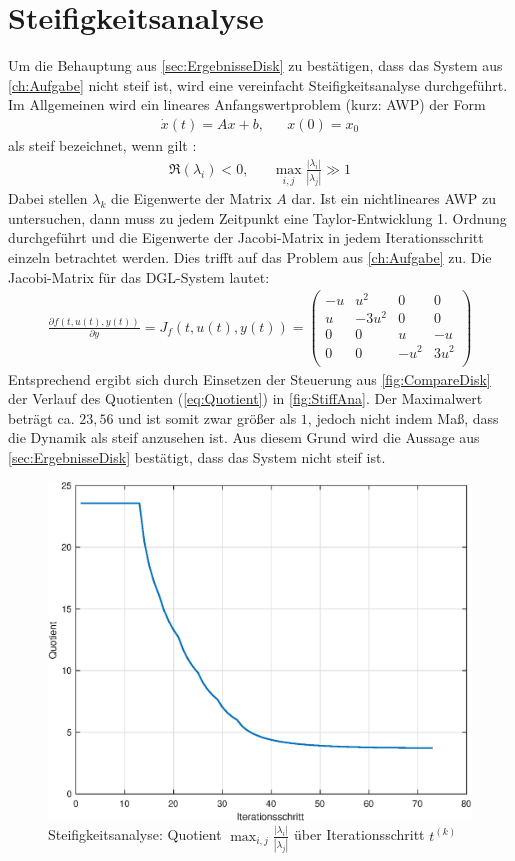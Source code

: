 \pagebreak

\section{Steifigkeitsanalyse}
Um die Behauptung aus \autoref{sec:ErgebnisseDisk} zu bestätigen, dass das System aus \autoref{ch:Aufgabe} nicht steif ist, wird eine vereinfacht Steifigkeitsanalyse durchgeführt. Im Allgemeinen wird ein lineares Anfangswertproblem (kurz: AWP) der Form
\begin{align}\label{eq:LinAWP}
	\dot{x}(t) = Ax+b, &&x(0) = x_0%
\end{align}
als steif bezeichnet, wenn gilt :
\begin{align} \label{eq:Quotient}
	\Re(\lambda_i) <0, &&\max_{i,j} \frac{|\lambda_i|}{|\lambda_j|} \gg 1
\end{align}
Dabei stellen $\lambda_k$ die Eigenwerte der Matrix $A$ dar. Ist ein nichtlineares AWP zu untersuchen, dann muss zu jedem Zeitpunkt eine Taylor-Entwicklung 1. Ordnung durchgeführt und die Eigenwerte der Jacobi-Matrix in jedem Iterationsschritt einzeln betrachtet werden. Dies trifft auf das Problem aus \autoref{ch:Aufgabe} zu. Die Jacobi-Matrix für das DGL-System lautet:
\begin{align}
	\frac{\partial f(t,u(t),y(t))}{\partial y} = J_f(t,u(t),y(t)) = \left(\begin{array}{cccc}
		-u&u^2&0&0\\
		u&-3u^2&0&0\\
		0&0&u&-u\\
		0&0&-u^2&3u^2\\
	\end{array}\right)			
\end{align}
Entsprechend ergibt sich durch Einsetzen der Steuerung aus \autoref{fig:CompareDisk} der Verlauf des Quotienten (\ref{eq:Quotient}) in \autoref{fig:StiffAna}. Der Maximalwert beträgt ca. $23,56$ und ist somit zwar größer als $1$, jedoch nicht indem Maß, dass die Dynamik als steif anzusehen ist. Aus diesem Grund wird die Aussage aus \autoref{sec:ErgebnisseDisk} bestätigt, dass das System nicht steif ist.
\begin{figure}[h!]
	\centering
	\includegraphics[width=.55\textwidth]{images/StiffAna}
	\caption{Steifigkeitsanalyse: Quotient $\max_{i,j} \frac{|\lambda_i|}{|\lambda_j|}$ über Iterationsschritt $t^{(k)}$}
	\label{fig:StiffAna}
\end{figure}
